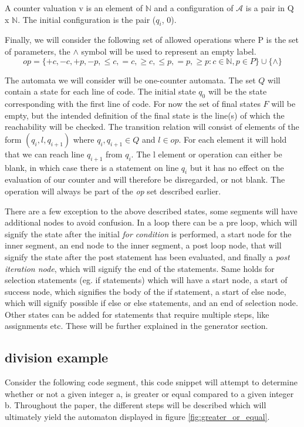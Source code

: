\documentclass[12pt]{article}
\begin{document}
A counter valuation v is an element of $\mathbb{N}$ and a configuration of $\mathcal{A}$ is a pair in Q x $\mathbb{N}$. The initial configuration is the pair ($q_i$, 0). 

Finally, we will consider the following set of allowed operations where P is the set of parameters, the $\wedge$ symbol will be used to represent an empty label.
\[
 op = \{+c, -c, +p, -p, \leq c, =c, \geq c, \leq p, =p, \geq p: c \in \mathbb{N}, p \in P\} \cup \{\wedge\}
\]

The automata we will consider will be one-counter automata. The set $Q$ will contain a state for each line of code. The initial state $q_0$ will be the state corresponding with the first line of code. For now the set of final states $F$ will be empty, but the intended definition of the final state is the line(s) of which the reachability will be checked. The transition relation will consist of elements of the form $(q_i, l, q_{i+1})$ where $q_i, q_{i+1} \in Q$ and $l \in op$. For each element it will hold that we can reach line $q_{i+1}$ from $q_i$. The l element or operation can either be blank, in which case there is a statement on line $q_i$ but it has no effect on the evaluation of our counter and will therefore be disregarded, or not blank. The operation will always be part of the \textit{op} set described earlier.

There are a few exception to the above described states, some segments will have additional nodes to avoid confusion. In a loop there can be a pre loop, which will signify the state after the initial \textit{for condition} is performed, a start node for the inner segment, an end node to the inner segment, a post loop node, that will signify the state after the post statement has been evaluated, and finally a \textit{post iteration node}, which will signify the end of the statements. Same holds for selection statements (eg. if statements) which will have a start node, a start of success node, which signifies the body of the if statement, a start of else node, which will signify possible if else or else statements, and an end of selection node. Other states can be added for statements that require multiple steps, like assignments etc. These will be further explained in the generator section.
\subsection{division example}
Consider the following code segment, this code snippet will attempt to determine whether or not a given integer a, is greater or equal compared to a given integer b. Throughout the paper, the different steps will be described which will ultimately yield the automaton displayed in figure \ref{fig:greater_or_equal}.
\end{document}
